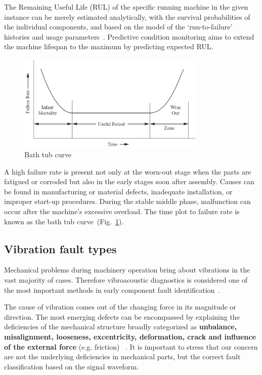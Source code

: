 The Remaining Useful Life (RUL) of the specific running machine in the given instance can be merely estimated analytically, with the survival probabilities of the individual components, and based on the model of the `run-to-failure' histories and usage parameters~\cite{okoh_overview_2014}. Predictive condition monitoring aims to extend the machine lifespan to the maximum by predicting expected RUL.

\begin{figure}[h]
	\centering
	\includegraphics[width=0.8\textwidth]{assets/bath-tub-curve.png}
	\caption{Bath tub curve~\cite{mohanty_machinery_2015}}
	\label{fig:bath-tub-curve}
\end{figure}

A high failure rate is present not only at the worn-out stage when the parts are fatigued or corroded but also in the early stages soon after assembly. Causes can be found in manufacturing or material defects, inadequate installation, or improper start-up procedures. During the stable middle phase, malfunction can occur after the machine's excessive overload. The time plot to failure rate is known as the bath tub curve~(Fig.~\ref{fig:bath-tub-curve}).

\subsection{Vibration fault types}
Mechanical problems during machinery operation bring about vibrations in the vast majority of cases. Therefore vibroacoustic diagnostics is considered one of the most important methods in early component fault identification~\cite{ziaran_technicka_2013}.

The cause of vibration comes out of the changing force in its magnitude or direction. The most emerging defects can be encompassed by explaining the deficiencies of the mechanical structure broadly categorized as \textbf{unbalance, misalignment, looseness, excentricity, deformation, crack and influence of the external force} (e.g. friction) ~\cite{davies_handbook_2012}. It is important to stress that our concern are not the underlying deficiencies in mechanical parts, but the correct fault classification based on the signal waveform.

